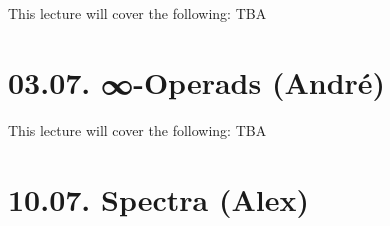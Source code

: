 \documentclass[a4paper]{amsart}
\numberwithin{figure}{section}
\theoremstyle{theorem}
\theoremstyle{definition}
\begin{document}
This lecture will cover the following: TBA
%
%
%
%
%
%

\section{03.07. ∞-Operads (André)}
This lecture will cover the following: TBA


%
%
%

\section{10.07. Spectra (Alex)}
\end{document}
